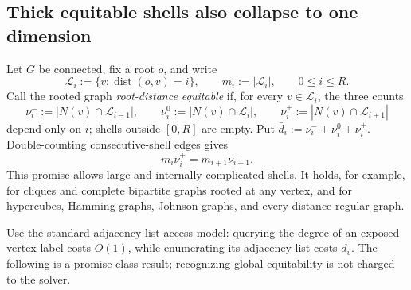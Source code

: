 \subsection{Thick equitable shells also collapse to one dimension}
\label{subsec:equitable-shells}

Let $G$ be connected, fix a root $o$, and write
\begin{equation}
 \mathcal L_i:=\{v:\operatorname{dist}(o,v)=i\},
 \qquad
 m_i:=|\mathcal L_i|,
 \qquad 0\leq i\leq R.
 \label{eq:equitable-shells}
\end{equation}
Call the rooted graph \emph{root-distance equitable} if, for every
$v\in\mathcal L_i$, the three counts
\begin{equation}
 \nu_i^-:=|N(v)\cap\mathcal L_{i-1}|,
 \qquad
 \nu_i^0:=|N(v)\cap\mathcal L_i|,
 \qquad
 \nu_i^+:=|N(v)\cap\mathcal L_{i+1}|
 \label{eq:equitable-neighbor-counts}
\end{equation}
depend only on $i$; shells outside $[0,R]$ are empty.  Put
$\bar d_i:=\nu_i^-+\nu_i^0+\nu_i^+$.  Double-counting consecutive-shell
edges gives
\begin{equation}
 m_i\nu_i^+=m_{i+1}\nu_{i+1}^-.
 \label{eq:equitable-edge-balance}
\end{equation}
This promise allows large and internally complicated shells.  It holds, for
example, for cliques and complete bipartite graphs rooted at any vertex, and
for hypercubes, Hamming graphs, Johnson graphs, and every distance-regular
graph.

Use the standard adjacency-list access model: querying the degree of an
exposed vertex label costs $O(1)$, while enumerating its adjacency list costs
$d_v$.  The following is a promise-class result; recognizing global
equitability is not charged to the solver.

